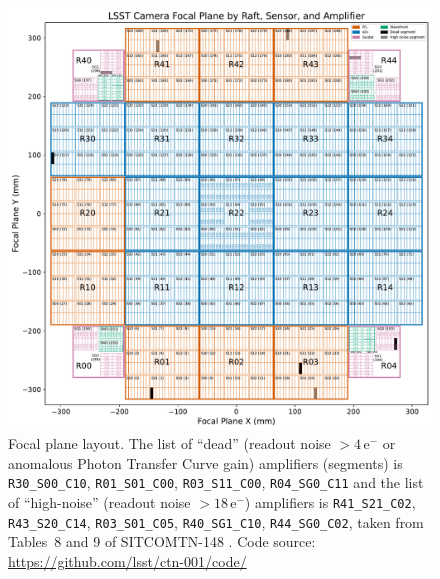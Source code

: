 \documentclass[OPS,authoryear,toc]{lsstdoc}
\begin{document}
\clearpage

\begin{figure}
  \centering
  \includegraphics[width=\textwidth]{figures/LSSTCam_focal_plane_CTN_001_FIG1.pdf}
  \caption{Focal plane layout. The list of ``dead'' (readout noise $> 4\,\mathrm{e}^{-}$ or anomalous Photon Transfer Curve gain) 
	amplifiers (segments) is {\tt{R30\_S00\_C10}}, {\tt{R01\_S01\_C00}}, {\tt{R03\_S11\_C00}}, {\tt{R04\_SG0\_C11}} 
and the list of ``high-noise'' (readout noise $> 18\,\mathrm{e}^{-}$) amplifiers is 
{{\tt{R41\_S21\_C02}}, {\tt{R43\_S20\_C14}}, {\tt{R03\_S01\_C05}}, {\tt{R40\_SG1\_C10}}, 
	{\tt{R44\_SG0\_C02}}, taken from Tables~8 and 9 of SITCOMTN-148 \citep{utsumi25}. Code source: \url{https://github.com/lsst/ctn-001/code/}}}
  \label{fig:focal_plane_1}
\end{figure}

\clearpage
\end{document}
